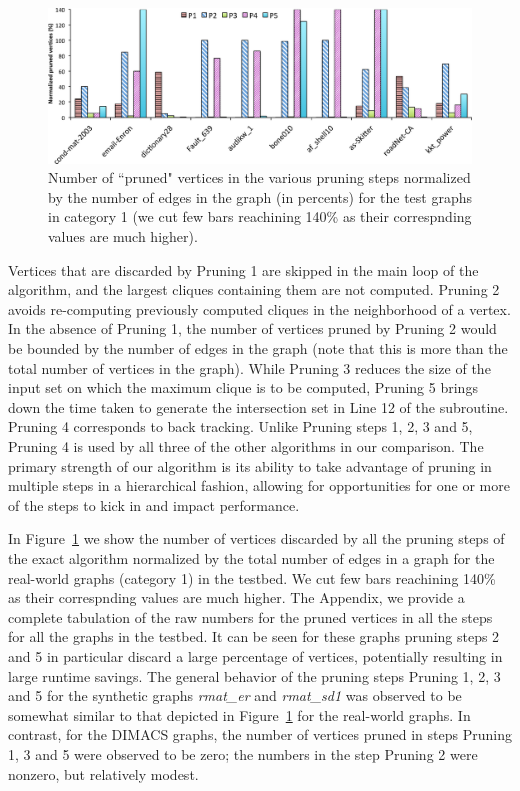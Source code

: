 \begin{figure}
  \centering
    \includegraphics[scale=0.4]{pruned.eps}
\caption{Number of ``pruned" vertices in the various pruning steps normalized
by the number of edges in the graph (in percents) for the test graphs in category 1 (we cut few bars reachining 140\% as their correspnding values are much higher).}
\label{fig-pruningplot}
\end{figure}

Vertices that are discarded by Pruning 1 are skipped in the main loop of the algorithm, and the largest cliques containing them are not computed. Pruning 2 avoids re-computing previously computed cliques in the neighborhood of a vertex. In the absence of Pruning 1, the number of vertices pruned by Pruning 2 would be bounded by the number of edges in the graph (note that this is more than the total number of vertices in the graph). While Pruning 3 reduces the size of the input set on which the maximum clique is to be computed, Pruning 5 brings down the time taken to generate the intersection set in Line 12 of the subroutine. 
Pruning 4 corresponds to back tracking. Unlike Pruning steps 1, 2, 3 and 5, Pruning 4
is used  by all three of the other algorithms in our comparison. The primary strength of our algorithm is its ability to take advantage of pruning in multiple steps in a hierarchical fashion, allowing for opportunities for one or more of the steps to kick in and impact performance.

In Figure~\ref{fig-pruningplot} we show the number of vertices discarded by all
the  pruning steps of the exact algorithm normalized by the total number of edges
in a graph for the real-world graphs (category 1) in the testbed. We cut few bars reachining
140\% as their correspnding values are much higher.
The Appendix, we provide a complete tabulation of the raw numbers for the pruned vertices in all the steps for all the graphs in the testbed. It can be seen for these graphs pruning steps 2 and 5 in particular discard a large percentage of vertices, potentially resulting in large runtime savings. The general behavior of the pruning steps Pruning 1, 2, 3 and 5 for the synthetic graphs {\em rmat\_er} and {\em rmat\_sd1} was observed to be somewhat similar to that depicted in Figure~\ref{fig-pruningplot} for the real-world graphs. In contrast, for the DIMACS graphs, the number of vertices pruned in steps Pruning 1, 3 and 5 were observed to be zero; the numbers in the step Pruning 2 were nonzero, but relatively modest.

